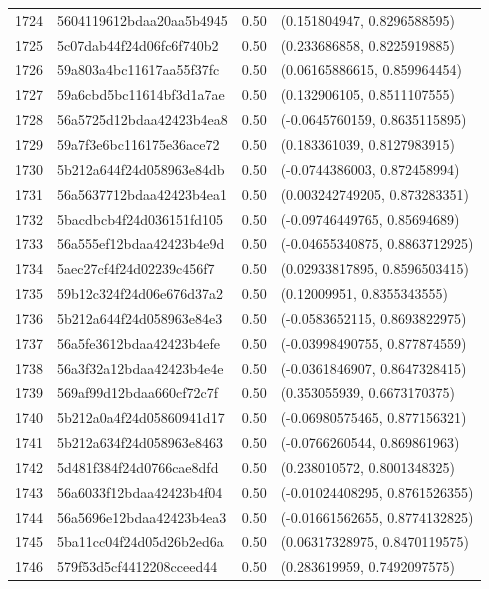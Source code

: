 \begin{table}[ht]
\begin{tabular}{rlrl}
  1724 & 5604119612bdaa20aa5b4945 & 0.50 & (0.151804947, 0.8296588595) \\ 
  1725 & 5c07dab44f24d06fc6f740b2 & 0.50 & (0.233686858, 0.8225919885) \\ 
  1726 & 59a803a4bc11617aa55f37fc & 0.50 & (0.06165886615, 0.859964454) \\ 
  1727 & 59a6cbd5bc11614bf3d1a7ae & 0.50 & (0.132906105, 0.8511107555) \\ 
  1728 & 56a5725d12bdaa42423b4ea8 & 0.50 & (-0.0645760159, 0.8635115895) \\ 
  1729 & 59a7f3e6bc116175e36ace72 & 0.50 & (0.183361039, 0.8127983915) \\ 
  1730 & 5b212a644f24d058963e84db & 0.50 & (-0.0744386003, 0.872458994) \\ 
  1731 & 56a5637712bdaa42423b4ea1 & 0.50 & (0.003242749205, 0.873283351) \\ 
  1732 & 5bacdbcb4f24d036151fd105 & 0.50 & (-0.09746449765, 0.85694689) \\ 
  1733 & 56a555ef12bdaa42423b4e9d & 0.50 & (-0.04655340875, 0.8863712925) \\ 
  1734 & 5aec27cf4f24d02239c456f7 & 0.50 & (0.02933817895, 0.8596503415) \\ 
  1735 & 59b12c324f24d06e676d37a2 & 0.50 & (0.12009951, 0.8355343555) \\ 
  1736 & 5b212a644f24d058963e84e3 & 0.50 & (-0.0583652115, 0.8693822975) \\ 
  1737 & 56a5fe3612bdaa42423b4efe & 0.50 & (-0.03998490755, 0.877874559) \\ 
  1738 & 56a3f32a12bdaa42423b4e4e & 0.50 & (-0.0361846907, 0.8647328415) \\ 
  1739 & 569af99d12bdaa660cf72c7f & 0.50 & (0.353055939, 0.6673170375) \\ 
  1740 & 5b212a0a4f24d05860941d17 & 0.50 & (-0.06980575465, 0.877156321) \\ 
  1741 & 5b212a634f24d058963e8463 & 0.50 & (-0.0766260544, 0.869861963) \\ 
  1742 & 5d481f384f24d0766cae8dfd & 0.50 & (0.238010572, 0.8001348325) \\ 
  1743 & 56a6033f12bdaa42423b4f04 & 0.50 & (-0.01024408295, 0.8761526355) \\ 
  1744 & 56a5696e12bdaa42423b4ea3 & 0.50 & (-0.01661562655, 0.8774132825) \\ 
  1745 & 5ba11cc04f24d05d26b2ed6a & 0.50 & (0.06317328975, 0.8470119575) \\ 
  1746 & 579f53d5cf4412208cceed44 & 0.50 & (0.283619959, 0.7492097575) \\ 

\end{tabular}
\end{table}
